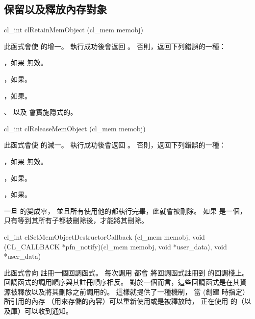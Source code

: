 \subsection{保留以及釋放內存對象}


\startCLFUNC
cl_int clRetainMemObject (cl_mem memobj)
\stopCLFUNC

此函式會使  的增一。
執行成功後會返回 。
否則，返回下列錯誤的一種：
\startigBase
\item {}，如果  無效。

\item {}，如果\scdevfailres。

\item {}，如果\schostfailres。
\stopigBase

、  以及 
會實施隱式的。


\startCLFUNC
cl_int clReleaseMemObject (cl_mem memobj)
\stopCLFUNC

此函式會使  的減一。
執行成功後會返回 。
否則，返回下列錯誤的一種：
\startigBase
\item {}，如果  無效。

\item {}，如果\scdevfailres。

\item {}，如果\schostfailres。
\stopigBase

一旦  的變成零，
並且所有使用他的都執行完畢，此就會被刪除。
如果  是一個，
只有等到其所有子都被刪除後，才能將其刪除。


\startCLFUNC
cl_int clSetMemObjectDestructorCallback (cl_mem memobj,
		void (CL_CALLBACK *pfn_notify)(cl_mem memobj,
			void *user_data),
		void *user_data)
\stopCLFUNC

此函式會向  註冊一個回調函式。
每次調用  都會
將回調函式註冊到  的回調棧上。
回調函式的調用順序與其註冊順序相反。
對於一個而言，這些回調函式是在其資源被釋放以及將其刪除之前調用的。
這樣就提供了一種機制，
當  (創建  時指定）所引用的內存
（用來存儲的內容）可以重新使用或是被釋放時，
正在使用  的（以及庫）可以收到通知。

